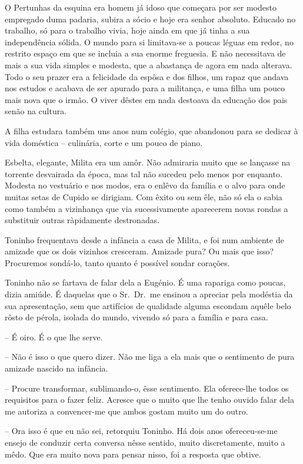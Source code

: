 \documentclass[9pt]{article}
\begin{document}
O Pertunhas da esquina era homem já idoso que começara por ser modesto empregado duma padaria, subira a sócio e hoje era senhor \mbox{absoluto}. Educado no traba\-lho, só para o traba\-lho vivia, hoje ainda em que já tinha a sua
independên\-cia sólida. O mundo para si limitava-se a poucas léguas em redor,
no restrito espaço em que se incluia a sua enorme freguesia. E não necessitava de mais a sua vida simples e modesta, que a abastan\-ça de agora em nada
alterava. Todo o seu prazer era a felicidade da espôsa e dos fi\-lhos, um rapaz que andava nos estudos e acabava de ser apurado para a  militan\-ça, e uma
fi\-lha um pouco mais nova que o irmão. O viver dêstes em nada destoava da
educa\-ção dos pais senão na cultura.

A fi\-lha estudara também uns anos num colégio, que abandonou para se
dedicar à vida doméstica -- culinária, corte e um pouco de piano.

Esbelta, elegante, Milita era um amôr. Não admiraria muito que se lan\-çasse na torrente desvairada da época, mas tal não sucedeu pelo menos por enquanto. Modesta no vestuário e nos modos, era o enlêvo da família e o alvo
para onde muitas setas de Cupido se dirigiam. Com êxito ou sem êle, não só
ela o sabia como também a vizinhan\-ça que via sucessivamente aparecerem novas rondas a substituir outras rà\-pi\-da\-men\-te destronadas.

Toninho frequentava desde a infância a casa de Milita, e foi num ambiente de amizade que os dois vizinhos cresceram. Amizade pura? Ou mais
que isso? Procuremos sondá-lo, tanto quanto é possível sondar cora\-ções.

Toninho não se fartava de falar dela a Eugé\-nio. É uma rapariga como
poucas, dizia amiúde. É daquelas que o Sr.\ Dr.\ me ensinou a apreciar pela
modéstia da sua apresenta\-ção, sem que artifícios de qualidade alguma escondam a\-quê\-le belo rôsto de pérola, isolada do mundo, vivendo só para a fa\-mí\-lia
e para casa.

-- É oiro. É o que lhe serve.

-- Não é isso o que quero dizer. Não me liga a ela mais que o sentimento de pura amizade nascido na infância.

-- Procure transformar, sublimando-o, êsse sentimento. Ela ofere\-\mbox{ce-lhe}
todos os requisitos para o fazer feliz. Acresce que o muito que lhe tenho
ouvido falar dela me autoriza a convencer-me que ambos gostam muito um do
outro.

-- Ora isso é que eu não sei, retorquiu Toninho. Há dois anos ofere\-ceu-se-me ensejo de conduzir certa conversa nêsse sentido, muito discretamente,
muito a mêdo. Que era muito nova para pensar nisso, foi a resposta que obtive.
\end{document}
